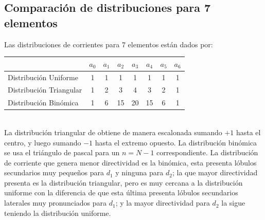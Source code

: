 \documentclass[11pt]{report}
\begin{document}
\subsection{Comparación de distribuciones para 7 elementos}

Las distribuciones de corrientes para 7 elementos están dados por: 

\begin{tabular}{l|c|c|c|c|c|c|c}
	& $a_0$ & $a_1$ & $a_2$ & $a_3$ & $a_4$ & $a_5$ & $a_6$ \\ \hline
	Distribución Uniforme 	& 1 & 1 & 1 & 1 & 1 & 1 & 1 \\
	Distribución Triangular & 1 & 2 & 3 & 4 & 3 & 2 & 1 \\
	Distribución Binómica 	& 1 & 6 & 15 & 20 & 15 & 6 & 1 \\
\end{tabular} \\

La distribución triangular de obtiene de manera escalonada sumando $+1$ hasta el centro, y luego sumando $-1$ hasta el extremo opuesto. La distribución binómica se usa el triángulo de pascal para un $n = N - 1$ correspondiente. 
La distribución de corriente que genera menor directividad es la binómica, esta presenta lóbulos secundarios muy pequeños para $d_1$ y ninguna para $d_2$; la que mayor directividad presenta es la distribución triangular, pero es muy cercana a la distribución uniforme con la diferencia de que esta última presenta lóbulos secundarios laterales muy pronunciados para $d_1$; y la mayor directividad para $d_2$ la sigue teniendo la distribución uniforme.
\end{document}
